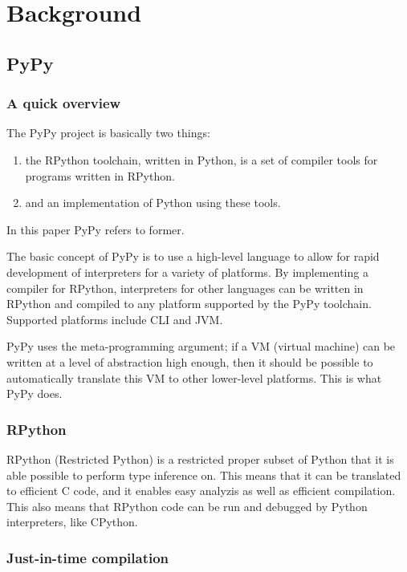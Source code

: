 
\section{Background}

\subsection{PyPy}

\subsubsection{A quick overview}

The PyPy project is basically two things:

\begin{enumerate}
\item the RPython toolchain, written in Python, is a set of compiler tools for 
programs written in RPython.
\item and an implementation of Python using these tools.
\end{enumerate}

In this paper PyPy refers to former.

The basic concept of PyPy is to use a high-level language to allow for rapid
development of interpreters for a variety of platforms. By implementing a compiler
for RPython, interpreters for other languages can be written in RPython and 
compiled to any platform supported by the PyPy toolchain. Supported platforms include
CLI and JVM. \cite{ancona2007rpython}

PyPy uses the meta-programming argument; if a VM (virtual machine) can be written
at a level of abstraction high enough, then it should be possible to automatically translate 
this VM to other lower-level platforms. This is what PyPy does. \cite{pypy}

\subsubsection{RPython}

RPython (Restricted Python) is a restricted proper subset of Python that it 
is able possible to perform type inference on. This means that it can be 
translated to efficient C code, and it enables easy analyzis 
as well as efficient compilation. This also means that RPython code can be
run and debugged by Python interpreters, like CPython. \cite{ancona2007rpython}

\subsubsection{Just-in-time compilation}

